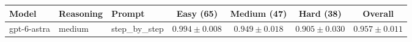 \begin{tabular}{lllcccc}
\hline
Model & Reasoning & Prompt & Easy (65) & Medium (47) & Hard (38) & Overall \\
\hline
gpt-6-astra & medium & step\_by\_step & $0.994\pm0.008$ & $0.949\pm0.018$ & $0.905\pm0.030$ & $0.957\pm0.011$ \\
\hline
\end{tabular}
